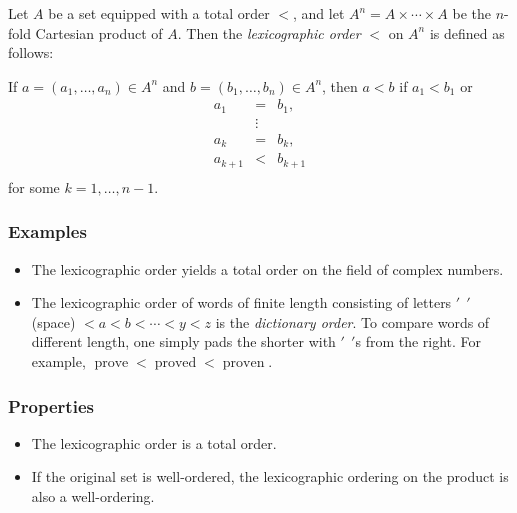 \documentclass[12pt]{article}
\newcommand{\wspace}[0]{'\ \ '}
\begin{document}
Let $A$ be a set equipped with a total order $<$, and let $A^n=A\times \cdots \times A$ be the $n$-fold Cartesian product of $A$.  Then the \emph{lexicographic order} $<$ on $A^n$ is defined as follows:
 
If $a=(a_1, \ldots, a_n)\in A^n$ and $b=(b_1, \ldots, b_n)\in A^n$, 
then $a<b$ if $a_1<b_1$ or
\begin{eqnarray*}
   a_1 &=& b_1, \\   
       &\vdots & \\
   a_k &=& b_k, \\
   a_{k+1} &<& b_{k+1} \\
\end{eqnarray*}
for some $k=1,\ldots, n-1$.

\subsubsection*{Examples}
\begin{itemize}
\item The lexicographic order yields a total order on the field of complex numbers.
\item The lexicographic order of words of finite length consisting of letters $\wspace$ (space) $<a<b<\cdots<y<z$ is the \emph{dictionary order}.  To compare words of different length, one simply pads the shorter with $\wspace$s from the right. For example, $\operatorname{prove} < \operatorname{proved} < \operatorname{proven}$.
\end{itemize}

\subsubsection*{Properties}
\begin{itemize}
\item 
The lexicographic order is a total order.
\item 
If the original set is well-ordered, the lexicographic ordering on the product is also a well-ordering.
\end{itemize}
\end{document}
